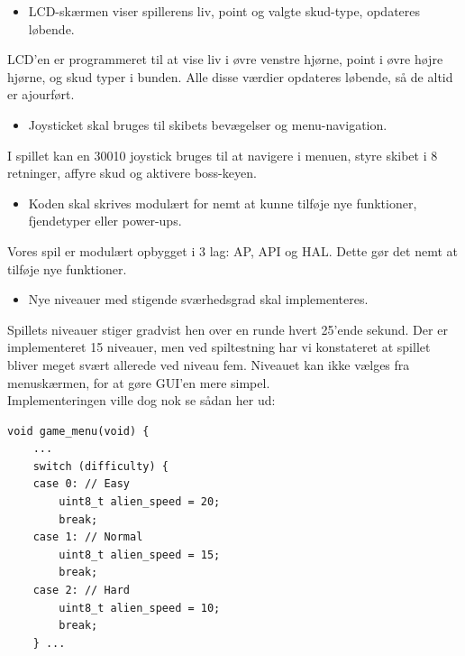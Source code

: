 \begin{itemize}
    \item LCD-skærmen viser spillerens liv, point og valgte skud-type, opdateres løbende.
\end{itemize}
LCD'en er programmeret til at vise liv i øvre venstre hjørne, point i øvre højre hjørne, og skud typer i bunden. Alle disse værdier opdateres løbende, så de altid er ajourført.

\begin{itemize}
    \item Joysticket skal bruges til skibets bevægelser og menu-navigation.
\end{itemize}
I spillet kan en 30010 joystick bruges til at navigere i menuen, styre skibet i 8 retninger, affyre skud og aktivere boss-keyen.

\begin{itemize}
    \item Koden skal skrives modulært for nemt at kunne tilføje nye funktioner, fjendetyper eller power-ups.
\end{itemize}
Vores spil er modulært opbygget i 3 lag: AP, API og HAL. Dette gør det nemt at tilføje nye funktioner.

\begin{itemize}
    \item Nye niveauer med stigende sværhedsgrad skal implementeres.
\end{itemize}
Spillets niveauer stiger gradvist hen over en runde hvert 25'ende sekund. Der er implementeret 15 niveauer, men ved spiltestning har vi konstateret at spillet bliver meget svært allerede ved niveau fem. Niveauet kan ikke vælges fra menuskærmen, for at gøre GUI'en mere simpel. \\ Implementeringen ville dog nok se sådan her ud:
\begin{lstlisting}[caption={Valg af sværhedsgrad kode}]
void game_menu(void) {
    ...
    switch (difficulty) {
    case 0: // Easy
        uint8_t alien_speed = 20;
        break;
    case 1: // Normal
        uint8_t alien_speed = 15;
        break;
    case 2: // Hard
        uint8_t alien_speed = 10;
        break;
    } ...
\end{lstlisting}